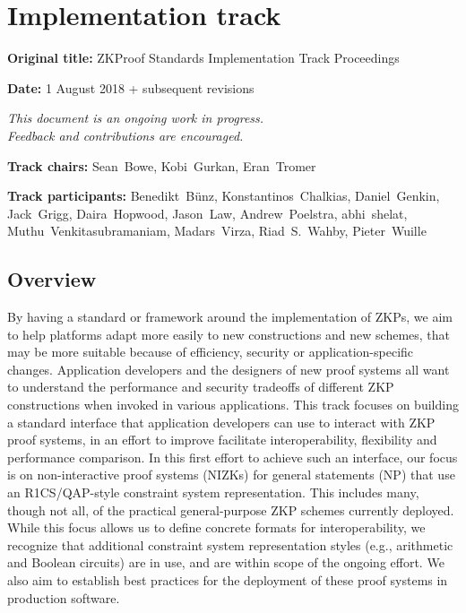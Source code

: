 \chapter{Implementation track}
\label{chap:track-implem}

\vspace{2em}
\textbf{Original title:} ZKProof Standards Implementation Track Proceedings

\textbf{Date:} 1 August 2018 + subsequent revisions

{\itshape\centering
{\color{ongoingred} This document is an ongoing work in progress.}\\
{\color{ongoingred} Feedback and contributions are encouraged.}\\
}

\vspace{1em}
\textbf{Track chairs:} 
Sean Bowe, Kobi Gurkan, Eran Tromer

\textbf{Track participants:} 
Benedikt Bünz, Konstantinos Chalkias, Daniel Genkin, Jack Grigg, Daira Hopwood, Jason Law, Andrew Poelstra, abhi shelat, Muthu Venkitasubramaniam, Madars Virza, Riad S. Wahby, Pieter Wuille



\section{Overview}
\label{implem:overview}
 
By having a standard or framework around the implementation of ZKPs, we aim to help platforms adapt more easily to new constructions and new schemes, that may be more suitable because of efficiency, security or application-specific changes. 
Application developers and the designers of new proof systems all want to understand the performance and security tradeoffs of different ZKP constructions when invoked in various applications. This track focuses on building a standard interface that application developers can use to interact with ZKP proof systems, in an effort to improve facilitate interoperability, flexibility and performance comparison.
In this first effort to achieve such an interface, our focus is on non-interactive proof systems (NIZKs) for general statements (NP) that use an R1CS/QAP-style constraint system representation. This includes many, though not all, of the practical general-purpose ZKP schemes currently deployed. While this focus allows us to define concrete formats for interoperability, we recognize that additional constraint system representation styles (e.g., arithmetic and Boolean circuits) are in use, and are within scope of the ongoing effort.
We also aim to establish best practices for the deployment of these proof systems in production software.


